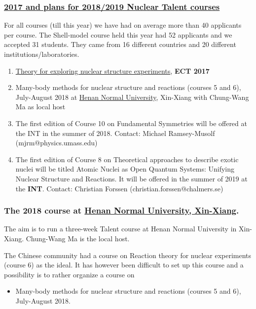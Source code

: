 \documentclass{beamer}
\begin{document}
\begin{frame}
\frametitle{\href{{http://fribtheoryalliance.org/TALENT/courses/courses.php}}{2017 and plans for 2018/2019 Nuclear Talent courses}}

\begin{block}{}
For all courses (till this year) we have had on average more than 40 applicants per course. The Shell-model course held this year had 52 applicants and we accepted 31 students. They came from 16 different countries and 20 different institutions/laboratories.


\begin{enumerate}
\item \href{{https://github.com/NuclearTalent/NuclearStructure}}{Theory for exploring nuclear structure experiments}, \textbf{ECT 2017}

\item Many-body methods for nuclear structure and reactions (courses 5 and 6), July-August 2018 at \href{{http://www.htu.cn/english/}}{Henan Normal University}, Xin-Xiang with Chung-Wang Ma as local host

\item The first edition of Course 10 on Fundamental Symmetries will be offered at the INT in the summer of 2018. Contact: Michael Ramsey-Musolf (mjrm@physics.umass.edu)

\item The first edition of Course 8 on Theoretical approaches to describe exotic nuclei will be titled Atomic Nuclei as Open Quantum Systems: Unifying Nuclear Structure and Reactions. It will be offered in the summer of 2019 at the \textbf{INT}. Contact: Christian Forssen (christian.forssen@chalmers.se)
\end{enumerate}

\noindent
\end{block}
\end{frame}

\begin{frame}
\frametitle{The 2018 course at \href{{http://www.htu.cn/english/}}{Henan Normal University, Xin-Xiang}.}

\begin{block}{}
The aim is to run a three-week Talent course at Henan Normal University in Xin-Xiang. Chung-Wang Ma is the local host. 

The Chinese community had a course on Reaction theory for nuclear experiments (course 6) as the ideal. It has however been difficult to set up this course and a possibility is to rather organize a course on

\begin{itemize}
\item Many-body methods for nuclear structure and reactions (courses 5 and 6), July-August 2018.
\end{itemize}

\noindent
\end{block}
\end{frame}
\end{document}
